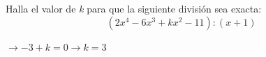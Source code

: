 \documentclass[addpoints,spanish, 12pt,a4paper]{exam}
\begin{document}
\begin{questions}




\addpoints



\question[1] Halla el valor de \emph{k} para que la siguiente división sea exacta: $$(2x^4-6x^3+kx^2-11):(x+1)$$
\begin{solution} $\to -3+k=0 \to k=3 $ \end{solution}


\addpoints



\end{questions}
\end{document}
